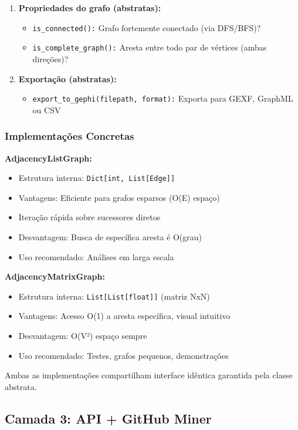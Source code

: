 \documentclass[12pt,a4paper]{article}
\begin{document}
\begin{enumerate}
  \item \textbf{Propriedades do grafo (abstratas):}
    \begin{itemize}
      \item \texttt{is\_connected():} Grafo fortemente conectado (via DFS/BFS)?
      \item \texttt{is\_complete\_graph():} Aresta entre todo par de vértices (ambas direções)?
    \end{itemize}

  \item \textbf{Exportação (abstratas):}
    \begin{itemize}
      \item \texttt{export\_to\_gephi(filepath, format):} Exporta para GEXF, GraphML ou CSV
    \end{itemize}
\end{enumerate}

\subsubsection{Implementações Concretas}

\textbf{AdjacencyListGraph:}
\begin{itemize}
  \item Estrutura interna: \texttt{Dict[int, List[Edge]]}
  \item Vantagens: Eficiente para grafos esparsos (O(E) espaço)
  \item Iteração rápida sobre sucessores diretos
  \item Desvantagem: Busca de específica aresta é O(grau)
  \item Uso recomendado: Análises em larga escala
\end{itemize}

\textbf{AdjacencyMatrixGraph:}
\begin{itemize}
  \item Estrutura interna: \texttt{List[List[float]]} (matriz NxN)
  \item Vantagens: Acesso O(1) a aresta específica, visual intuitivo
  \item Desvantagem: O(V²) espaço sempre
  \item Uso recomendado: Testes, grafos pequenos, demonstrações
\end{itemize}

Ambas as implementações compartilham interface idêntica garantida pela classe abstrata.

\subsection{Camada 3: API + GitHub Miner}
\end{document}
